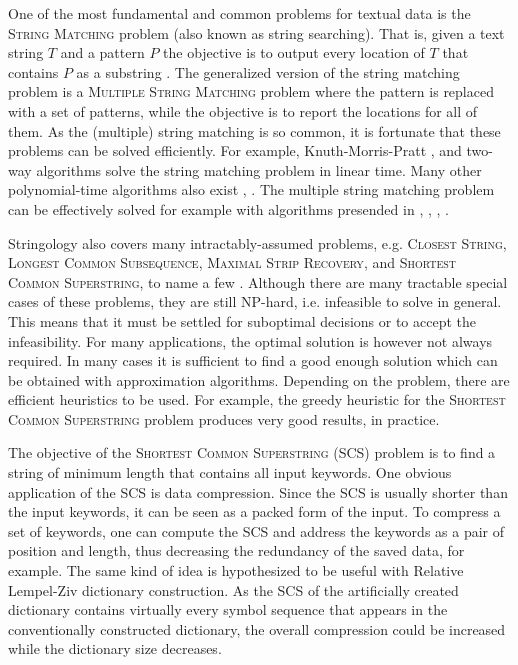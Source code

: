 \documentclass[english,twoside,censored,csm,algorithms-track-2020]{HYthesisML}
\theoremstyle{plain}
\theoremstyle{definition}
\begin{document}
One of the most fundamental and common problems for textual data is the \textsc{String Matching} problem
(also known as string searching). 
That is, given a text string $T$ and a pattern $P$ the objective is to output every location of
$T$ that contains $P$ as a substring \citep{Gusfield97}. The generalized version of the string
matching problem is a \textsc{Multiple String Matching} problem where the pattern is replaced with a set of
patterns, while the objective is to report the locations for all of them. As the (multiple) string
matching is so common, it is fortunate that these problems can be solved efficiently.
For example, Knuth-Morris-Pratt \citep{Knuth77}, and two-way \citep{Crochemore91}
algorithms solve the string matching problem in linear time. Many other polynomial-time algorithms
also exist \citep{Karp87}, \citep{Horspool80}.
The multiple string matching problem can be effectively solved for example with algorithms
presended in \citep{Aho75}, \citep{Navarro00}, \citep{Karp87}, \citep{CommentzWalter79}.

Stringology also covers many intractably-assumed problems, e.g. 
\textsc{Closest String},
\textsc{Longest Common Subsequence},
\textsc{Maximal Strip Recovery},
and
\textsc{Shortest Common Superstring},
to name a few \citep{Bulteau14}.
Although there are many tractable special cases of these problems, they are still \textsc{NP}-hard,
i.e. infeasible to solve in general. This means that it must be settled for suboptimal decisions
or to accept the infeasibility.
For many applications, the optimal solution is however not always required. In many cases it is
sufficient to find a good enough solution which can be obtained with approximation algorithms.
Depending on the problem, there are efficient heuristics to be used. For example, the
greedy heuristic for the \textsc{Shortest Common Superstring} problem produces very good
results, in practice. 


The objective of the \textsc{Shortest Common Superstring} (SCS) problem is to find a string of
minimum length that contains all input keywords.
One obvious application of the SCS is data compression. Since the SCS is usually shorter
than the input keywords, it can be seen as a packed form of the input. To compress a set of keywords,
one can compute the SCS and address the keywords as a pair of position and length, thus decreasing
the redundancy of the saved data, for example. The same kind of idea is hypothesized to be useful
with Relative Lempel-Ziv dictionary construction. As the SCS of the artificially created dictionary
contains virtually every symbol sequence that appears in the conventionally constructed dictionary,
the overall compression could be increased while the dictionary size decreases.
\end{document}
